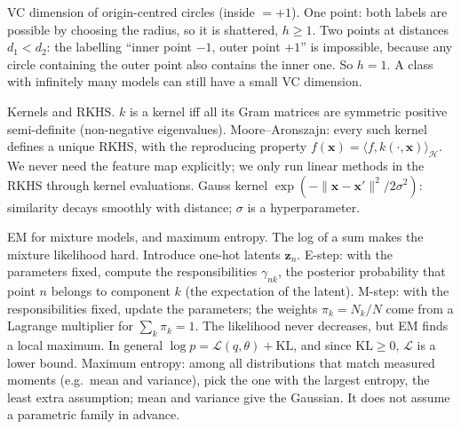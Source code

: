 \begin{qabox}[Holzleitner]{\cexam VC dimension of origin-centred circles (inside $=+1$).}
\ans One point: both labels are possible by choosing the radius, so it is shattered, $h\ge1$. Two
points at distances $d_1<d_2$: the labelling ``inner point $-1$, outer point $+1$'' is impossible,
because any circle containing the outer point also contains the inner one. So $h=1$. A class with
infinitely many models can still have a small VC dimension.
\end{qabox}

\begin{qabox}[Holzleitner]{\cexam Kernels and RKHS.}
\ans $k$ is a kernel iff all its Gram matrices are symmetric positive semi-definite (non-negative
eigenvalues). Moore--Aronszajn: every such kernel defines a unique RKHS, with the reproducing
property $f(\mathbf{x})=\langle f,k(\cdot,\mathbf{x})\rangle_{\mathcal{H}}$. We never need the feature
map explicitly; we only run linear methods in the RKHS through kernel evaluations. Gauss kernel
$\exp(-\lVert\mathbf{x}-\mathbf{x}'\rVert^2/2\sigma^2)$: similarity decays smoothly with distance;
$\sigma$ is a hyperparameter.
\end{qabox}

\begin{qabox}[Holzleitner]{\cexam EM for mixture models, and maximum entropy.}
\ans The log of a sum makes the mixture likelihood hard. Introduce one-hot latents $\mathbf{z}_n$.
E-step: with the parameters fixed, compute the responsibilities $\gamma_{nk}$, the posterior
probability that point $n$ belongs to component $k$ (the expectation of the latent). M-step: with the
responsibilities fixed, update the parameters; the weights $\pi_k=N_k/N$ come from a Lagrange
multiplier for $\sum_k\pi_k=1$. The likelihood never decreases, but EM finds a local maximum.
In general $\log p=\mathcal{L}(q,\theta)+\mathrm{KL}$, and since $\mathrm{KL}\ge0$, $\mathcal{L}$ is a lower bound.
Maximum entropy: among all distributions that match measured moments (e.g.\ mean and variance),
pick the one with the largest entropy, the least extra assumption; mean and variance give the
Gaussian. It does not assume a parametric family in advance.
\end{qabox}

